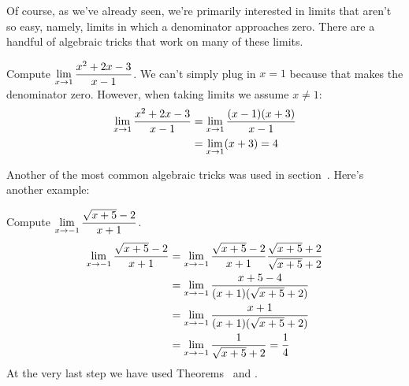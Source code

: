 Of course, as we've already seen, we're primarily interested in limits
that aren't so easy, namely, limits in which a denominator approaches
zero. There are a handful of algebraic tricks that work on many of
these limits.


\begin{example}
Compute $\displaystyle\lim_{x\to1}{x^2+2x-3\over x-1}$. We can't simply plug in
$x=1$ because that makes the denominator zero.  However, when taking
limits we assume $x\ne 1$:
\begin{align*}
\lim_{x\to1}{x^2+2x-3\over x-1}&=\lim_{x\to1}{(x-1)(x+3)\over x-1} \\
&=\lim_{x\to1}(x+3)=4 \\
\end{align*}
\vskip-10pt
\end{example}
Another of the most common algebraic tricks was used in
section~. Here's another example:

\begin{example}
Compute $\displaystyle\lim_{x\to-1} {\sqrt{x+5}-2\over x+1}$.
\begin{align*}
\lim_{x\to-1} {\sqrt{x+5}-2\over x+1}&=
\lim_{x\to-1} {\sqrt{x+5}-2\over x+1}{\sqrt{x+5}+2\over \sqrt{x+5}+2} \\
&=\lim_{x\to-1} {x+5-4\over (x+1)(\sqrt{x+5}+2)} \\
&=\lim_{x\to-1} {x+1\over (x+1)(\sqrt{x+5}+2)} \\
&=\lim_{x\to-1} {1\over \sqrt{x+5}+2}={1\over4} \\
\end{align*}
At the very last step we have used Theorems~ and .
\end{example}





